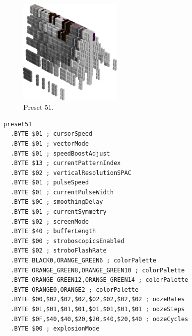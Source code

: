 \clearpage
\begin{minipage}[b]{0.48\linewidth}
\begin{figure}[H]                                                          
  \centering                                                             
  \begin{adjustbox}{width=5cm,center}                                   
  \includegraphics[width=5cm]{src/colorspace_presets/preset51-45.png}%
  \end{adjustbox}                                                        
\caption*{Preset 51.}                                           
\end{figure}                                                               
\end{minipage}
\hspace{0.1cm}
\begin{minipage}[b]{0.48\linewidth}                            
\begin{lstlisting}[basicstyle=\ttfamily\tiny]
preset51
  .BYTE $01 ; cursorSpeed
  .BYTE $01 ; vectorMode
  .BYTE $01 ; speedBoostAdjust
  .BYTE $13 ; currentPatternIndex
  .BYTE $02 ; verticalResolutionSPAC
  .BYTE $01 ; pulseSpeed
  .BYTE $01 ; currentPulseWidth
  .BYTE $0C ; smoothingDelay
  .BYTE $01 ; currentSymmetry
  .BYTE $02 ; screenMode
  .BYTE $40 ; bufferLength
  .BYTE $00 ; stroboscopicsEnabled
  .BYTE $02 ; stroboFlashRate
  .BYTE BLACK0,ORANGE_GREEN6 ; colorPalette
  .BYTE ORANGE_GREEN8,ORANGE_GREEN10 ; colorPalette
  .BYTE ORANGE_GREEN12,ORANGE_GREEN14 ; colorPalette
  .BYTE ORANGE0,ORANGE2 ; colorPalette
  .BYTE $00,$02,$02,$02,$02,$02,$02,$02 ; oozeRates
  .BYTE $01,$01,$01,$01,$01,$01,$01,$01 ; oozeSteps
  .BYTE $0F,$40,$40,$20,$20,$40,$20,$40 ; oozeCycles
  .BYTE $00 ; explosionMode
\end{lstlisting}
\end{minipage}

\vspace*{-0.3cm}

